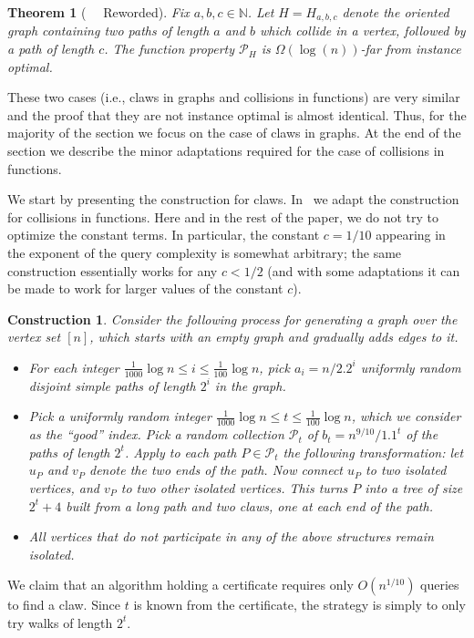 \documentclass[11pt]{article}
\numberwithin{equation}{section}
\newtheorem{theorem}{Theorem}[section]
\newtheorem{construction}[construction]{Construction}
\newcommand{\N}{\mathbb N}
\renewcommand{\P}{\mathcal{P}}
\newcommand{\1}{\mathbf{1}}
\begin{document}
\begin{theorem}[~~ Reworded]\label{thm:3.2}
Fix $a,b,c \in \N$. Let $H = H_{a,b,c}$ denote the oriented graph containing two paths of length $a$ and $b$ which collide in a vertex, followed by a path of length $c$. 
The function property $\P_H$ is $\Omega(\log(n))$-far from instance optimal. 
\end{theorem}


These two cases (i.e., claws in graphs and collisions in functions) are very similar and the proof that they are not instance optimal is almost identical. Thus, for the majority of the section we focus on the case of claws in graphs. At the end of the section we describe the minor adaptations required for the case of collisions in functions.





We start by presenting the construction for claws. In~ we adapt the construction for collisions in functions. Here and in the rest of the paper, we do not try to optimize the constant terms. In particular, the constant $c=1/10$ appearing in the exponent of the query complexity is somewhat arbitrary; the same construction essentially works for any $c < 1/2$ (and with some adaptations it can be made to work for larger values of the constant $c$).



\begin{construction}
\label{const:first_const}
Consider the following process for generating a graph over the vertex set $[n]$, which starts with an empty graph and gradually adds edges to it.

\begin{itemize}
    \item For each integer $\frac{1}{1000}  \log n \leq i \leq \frac{1}{100} \log n$, pick $a_i = n / 2.2^i$ uniformly random disjoint simple paths of length $2^i$ in the graph. 
    
    \item Pick a uniformly random integer $\frac{1}{1000} \log n \leq t \leq \frac{1}{100} \log n$, which we consider as the ``good'' index. Pick a random collection $\P_t$ of $b_t = n^{9/10} / 1.1^t$ of the paths of length $2^t$. Apply to each path $P \in \P_t$ the following transformation:
    let $u_P$ and $v_P$ denote the two ends of the path. Now connect $u_P$ to two isolated vertices, and $v_{P}$ to two other isolated vertices. This turns $P$ into a tree of size $2^t + 4$ built from a long path and two claws, one at each end of the path.
    
    \item All vertices that do not participate in any of the above structures remain isolated. 
\end{itemize}

\end{construction}
We claim that an algorithm holding a certificate requires only $O(n^{1/10})$ queries to find a claw. Since $t$ is known from the certificate, the strategy is simply to only try walks of length $2^t$.
\end{document}
